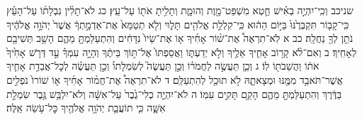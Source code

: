 \documentclass[twoside, openany, parskip=half, 11pt]{book}
\begin{document}
שניכב וְכִֽי־יִהְיֶ֣ה בְאִ֗ישׁ חֵ֛טְא מִשְׁפַּט־מָ֖וֶת וְהוּמָ֑ת וְתָלִ֥יתָ אֹת֖וֹ עַל־עֵֽץ׃ כג לֹא־תָלִ֨ין נִבְלָת֜וֹ עַל־הָעֵ֗ץ כִּֽי־קָב֤וֹר תִּקְבְּרֶ֙נּוּ֙ בַּיּ֣וֹם הַה֔וּא כִּֽי־קִלְלַ֥ת אֱלֹהִ֖ים תָּל֑וּי וְלֹ֤א תְטַמֵּא֙ אֶת־אַדְמָ֣תְךָ֔ אֲשֶׁר֙ יְהֹוָ֣ה אֱלֹהֶ֔יךָ נֹתֵ֥ן לְךָ֖ נַחֲלָֽה׃
כב א לֹֽא־תִרְאֶה֩ אֶת־שׁ֨וֹר אָחִ֜יךָ א֤וֹ אֶת־שֵׂיוֹ֙ נִדָּחִ֔ים וְהִתְעַלַּמְתָּ֖ מֵהֶ֑ם הָשֵׁ֥ב תְּשִׁיבֵ֖ם לְאָחִֽיךָ׃ ב וְאִם־לֹ֨א קָר֥וֹב אָחִ֛יךָ אֵלֶ֖יךָ וְלֹ֣א יְדַעְתּ֑וֹ וַאֲסַפְתּוֹ֙ אֶל־תּ֣וֹךְ בֵּיתֶ֔ךָ וְהָיָ֣ה עִמְּךָ֗ עַ֣ד דְּרֹ֤שׁ אָחִ֙יךָ֙ אֹת֔וֹ וַהֲשֵׁבֹת֖וֹ לֽוֹ׃ ג וְכֵ֧ן תַּעֲשֶׂ֣ה לַחֲמֹר֗וֹ וְכֵ֣ן תַּעֲשֶׂה֮ לְשִׂמְלָתוֹ֒ וְכֵ֣ן תַּעֲשֶׂ֗ה לְכׇל־אֲבֵדַ֥ת אָחִ֛יךָ אֲשֶׁר־תֹּאבַ֥ד מִמֶּ֖נּוּ וּמְצָאתָ֑הּ לֹ֥א תוּכַ֖ל לְהִתְעַלֵּֽם׃
ד לֹא־תִרְאֶה֩ אֶת־חֲמ֨וֹר אָחִ֜יךָ א֤וֹ שׁוֹרוֹ֙ נֹפְלִ֣ים בַּדֶּ֔רֶךְ וְהִתְעַלַּמְתָּ֖ מֵהֶ֑ם הָקֵ֥ם תָּקִ֖ים עִמּֽוֹ׃
ה לֹא־יִהְיֶ֤ה כְלִי־גֶ֙בֶר֙ עַל־אִשָּׁ֔ה וְלֹא־יִלְבַּ֥שׁ גֶּ֖בֶר שִׂמְלַ֣ת אִשָּׁ֑ה כִּ֧י תוֹעֲבַ֛ת יְהֹוָ֥ה אֱלֹהֶ֖יךָ כׇּל־עֹ֥שֵׂה אֵֽלֶּה׃
\end{document}
